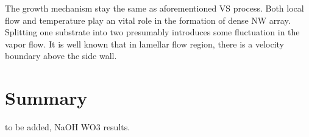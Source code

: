 The growth mechanism stay the same as aforementioned VS process. Both local flow and temperature play an vital role in the formation of dense NW array. Splitting one substrate into two presumably introduces some fluctuation in the vapor flow. It is well known that in lamellar flow region, there is a velocity boundary above the side wall.

\section{Summary}

to be added, NaOH WO3 results. 


